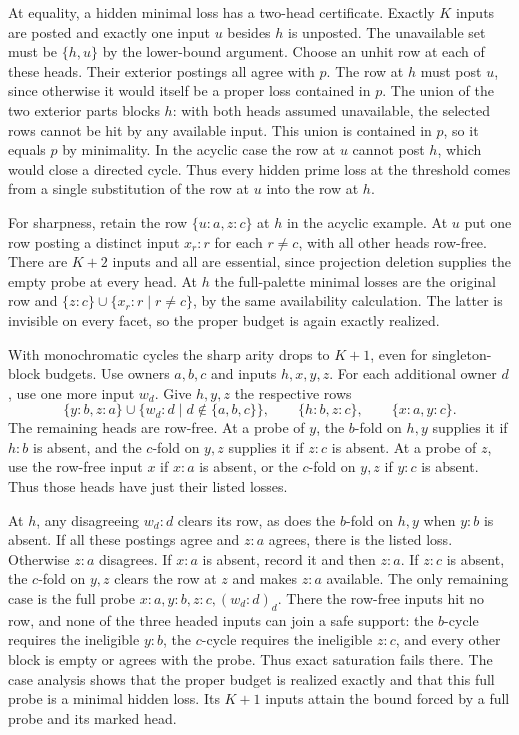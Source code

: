 At equality, a hidden minimal loss has a
two-head certificate. Exactly $K$ inputs are
posted and exactly one input $u$ besides $h$
is unposted. The unavailable set must be
$\{h,u\}$ by the lower-bound argument.
Choose an unhit row at each of these heads.
Their exterior postings all agree with $p$.
The row at $h$ must post $u$, since otherwise
it would itself be a proper loss contained
in $p$. The union of the two exterior parts
blocks $h$: with both heads assumed
unavailable, the selected rows cannot be
hit by any available input. This union is
contained in $p$, so it equals $p$ by
minimality. In the acyclic case the row
at $u$ cannot post $h$, which would close
a directed cycle. Thus every hidden prime
loss at the threshold comes from a single
substitution of the row at $u$ into the
row at $h$.

For sharpness, retain the row $\{u:a,z:c\}$
at $h$ in the acyclic example. At $u$ put
one row posting a distinct input $x_r:r$
for each $r\ne c$, with all other heads
row-free. There are $K+2$ inputs and all
are essential, since projection deletion
supplies the empty probe at every head.
At $h$ the full-palette minimal losses
are the original row and
$\{z:c\}\cup\{x_r:r\mid r\ne c\}$, by the
same availability calculation. The latter
is invisible on every facet, so the proper
budget is again exactly realized.

With monochromatic cycles the sharp arity drops
to $K+1$, even for singleton-block budgets.
Use owners $a,b,c$ and inputs $h,x,y,z$.
For each additional owner $d$, use one more
input $w_d$. Give $h,y,z$ the respective rows
\[
 \{y:b,z:a\}\cup\{w_d:d\mid d\notin\{a,b,c\}\},
 \qquad \{h:b,z:c\},\qquad \{x:a,y:c\}.
\]
The remaining heads are row-free. At a probe
of $y$, the $b$-fold on $h,y$ supplies it if
$h:b$ is absent, and the $c$-fold on $y,z$
supplies it if $z:c$ is absent. At a probe of
$z$, use the row-free input $x$ if $x:a$ is
absent, or the $c$-fold on $y,z$ if $y:c$ is
absent. Thus those heads have just their
listed losses.

At $h$, any disagreeing $w_d:d$ clears its
row, as does the $b$-fold on $h,y$ when
$y:b$ is absent. If all these postings agree
and $z:a$ agrees, there is the listed loss.
Otherwise $z:a$ disagrees. If $x:a$ is absent,
record it and then $z:a$. If $z:c$ is
absent, the $c$-fold on $y,z$ clears the
row at $z$ and makes $z:a$ available.
The only remaining case is the full probe
$x:a,y:b,z:c,(w_d:d)_d$. There the row-free
inputs hit no row, and none of the three
headed inputs can join a safe support:
the $b$-cycle requires the ineligible
$y:b$, the $c$-cycle requires the
ineligible $z:c$, and every other block
is empty or agrees with the probe.
Thus exact saturation fails there. The
case analysis shows that the proper budget
is realized exactly and that this full
probe is a minimal hidden loss. Its $K+1$
inputs attain the bound forced by a full
probe and its marked head.

